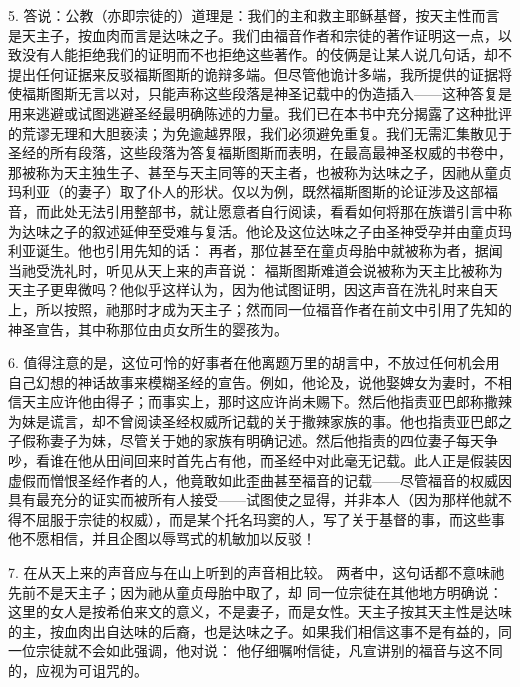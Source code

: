 5. 答说：公教（亦即宗徒的）道理是：我们的主和救主耶稣基督，按天主性而言是天主子，按血肉而言是达味之子。我们由福音作者和宗徒的著作证明这一点，以致没有人能拒绝我们的证明而不也拒绝这些著作。的伎俩是让某人说几句话，却不提出任何证据来反驳福斯图斯的诡辩多端。但尽管他诡计多端，我所提供的证据将使福斯图斯无言以对，只能声称这些段落是神圣记载中的伪造插入——这种答复是用来逃避或试图逃避圣经最明确陈述的力量。我们已在本书中充分揭露了这种批评的荒谬无理和大胆亵渎；为免逾越界限，我们必须避免重复。我们无需汇集散见于圣经的所有段落，这些段落为答复福斯图斯而表明，在最高最神圣权威的书卷中，那被称为天主独生子、甚至与天主同等的天主者，也被称为达味之子，因祂从童贞玛利亚（的妻子）取了仆人的形状。仅以为例，既然福斯图斯的论证涉及这部福音，而此处无法引用整部书，就让愿意者自行阅读，看看如何将那在族谱引言中称为达味之子的叙述延伸至受难与复活。他论及这位达味之子由圣神受孕并由童贞玛利亚诞生。他也引用先知的话： 再者，那位甚至在童贞母胎中就被称为者，据闻当祂受洗礼时，听见从天上来的声音说： 福斯图斯难道会说被称为天主比被称为天主子更卑微吗？他似乎这样认为，因为他试图证明，因这声音在洗礼时来自天上，所以按照，祂那时才成为天主子；然而同一位福音作者在前文中引用了先知的神圣宣告，其中称那位由贞女所生的婴孩为。\par

6. 值得注意的是，这位可怜的好事者在他离题万里的胡言中，不放过任何机会用自己幻想的神话故事来模糊圣经的宣告。例如，他论及，说他娶婢女为妻时，不相信天主应许他由得子；而事实上，那时这应许尚未赐下。然后他指责亚巴郎称撒辣为妹是谎言，却不曾阅读圣经权威所记载的关于撒辣家族的事。他也指责亚巴郎之子假称妻子为妹，尽管关于她的家族有明确记述。然后他指责的四位妻子每天争吵，看谁在他从田间回来时首先占有他，而圣经中对此毫无记载。此人正是假装因虚假而憎恨圣经作者的人，他竟敢如此歪曲甚至福音的记载——尽管福音的权威因具有最充分的证实而被所有人接受——试图使之显得，并非本人（因为那样他就不得不屈服于宗徒的权威），而是某个托名玛窦的人，写了关于基督的事，而这些事他不愿相信，并且企图以辱骂式的机敏加以反驳！\par

7. 在从天上来的声音应与在山上听到的声音相比较。 两者中，这句话都不意味祂先前不是天主子；因为祂从童贞母胎中取了，却 同一位宗徒在其他地方明确说： 这里的女人是按希伯来文的意义，不是妻子，而是女性。天主子按其天主性是达味的主，按血肉出自达味的后裔，也是达味之子。如果我们相信这事不是有益的，同一位宗徒就不会如此强调，他对说： 他仔细嘱咐信徒，凡宣讲别的福音与这不同的，应视为可诅咒的。\par

